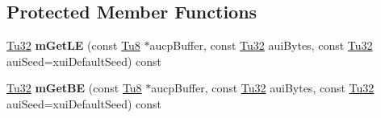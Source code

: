 \subsection*{Protected Member Functions}
\begin{DoxyCompactItemize}
\item 
\mbox{\label{class_g_n_common_1_1_n_data_authentication_1_1_tc_c_r_c32_a49ddbc037d24f8d61766e5de26d7a362}} 
\mbox{\hyperlink{namespace_g_n_common_a941b527ef318f318aed7903dc832b7e4}{Tu32}} {\bfseries m\+Get\+LE} (const \mbox{\hyperlink{namespace_g_n_common_a7939e251ddbf5d3a31832dcfdc8bde39}{Tu8}} $\ast$aucp\+Buffer, const \mbox{\hyperlink{namespace_g_n_common_a941b527ef318f318aed7903dc832b7e4}{Tu32}} aui\+Bytes, const \mbox{\hyperlink{namespace_g_n_common_a941b527ef318f318aed7903dc832b7e4}{Tu32}} aui\+Seed=xui\+Default\+Seed) const
\item 
\mbox{\label{class_g_n_common_1_1_n_data_authentication_1_1_tc_c_r_c32_a9fc8881e9adea73851da7d4b66fb2886}} 
\mbox{\hyperlink{namespace_g_n_common_a941b527ef318f318aed7903dc832b7e4}{Tu32}} {\bfseries m\+Get\+BE} (const \mbox{\hyperlink{namespace_g_n_common_a7939e251ddbf5d3a31832dcfdc8bde39}{Tu8}} $\ast$aucp\+Buffer, const \mbox{\hyperlink{namespace_g_n_common_a941b527ef318f318aed7903dc832b7e4}{Tu32}} aui\+Bytes, const \mbox{\hyperlink{namespace_g_n_common_a941b527ef318f318aed7903dc832b7e4}{Tu32}} aui\+Seed=xui\+Default\+Seed) const
\end{DoxyCompactItemize}
